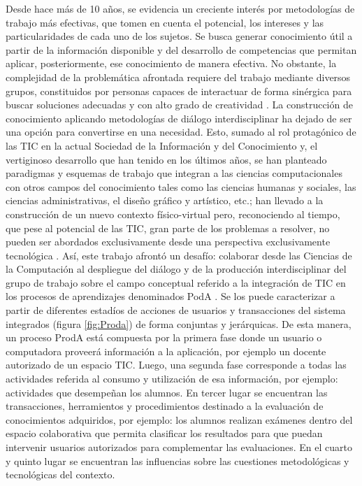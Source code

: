 Desde hace más de 10 años, se evidencia un creciente interés por metodologías de trabajo más efectivas, que tomen en cuenta el potencial, los intereses y las particularidades de cada uno de los sujetos. Se busca generar conocimiento útil a partir de la información disponible y del desarrollo de competencias que permitan aplicar, posteriormente, ese conocimiento de manera efectiva. No obstante, la complejidad de la problemática afrontada requiere del trabajo mediante diversos grupos, constituidos por personas capaces de interactuar de forma sinérgica para buscar soluciones adecuadas y con alto grado de creatividad \cite{cap1.1}. La construcción de conocimiento aplicando metodologías de diálogo interdisciplinar ha dejado de ser una opción para convertirse en una necesidad. Esto, sumado al rol protagónico de las TIC en la actual Sociedad de la Información y del Conocimiento y, el vertiginoso desarrollo que han tenido en los últimos años, se han planteado paradigmas y esquemas de trabajo que integran a las ciencias computacionales con otros campos del conocimiento tales como las ciencias humanas y sociales, las ciencias administrativas, el diseño gráfico y artístico, etc.; han llevado a la construcción de un nuevo contexto físico-virtual pero, reconociendo al tiempo, que pese al potencial de las TIC, gran parte de los problemas a resolver, no pueden ser abordados exclusivamente desde una perspectiva exclusivamente tecnológica \cite{cap1.2,cap1.3}. Así, este trabajo afrontó un desafío: colaborar desde las Ciencias de la Computación al despliegue del diálogo y de la producción interdisciplinar del grupo de trabajo sobre el campo conceptual referido a la integración de TIC en los procesos de aprendizajes denominados PodA \label{ProdA}. Se los puede caracterizar a partir de diferentes estadíos de acciones de usuarios y transacciones del sistema  integrados (figura \ref{fig:Proda}) de forma conjuntas y jerárquicas. De esta manera, un proceso ProdA está compuesta por la primera fase donde un usuario o computadora proveerá información a la aplicación, por ejemplo un docente autorizado de un espacio TIC. Luego, una segunda fase corresponde a todas las actividades referida al consumo y utilización de esa información,  por ejemplo: actividades que desempeñan los alumnos. En tercer lugar se encuentran las transacciones, herramientos y procedimientos destinado a la evaluación de conocimientos adquiridos,  por ejemplo: los alumnos realizan exámenes dentro del espacio colaborativa que permita clasificar los resultados para que puedan intervenir usuarios autorizados para complementar las evaluaciones.  En el cuarto y quinto lugar se encuentran las influencias sobre las cuestiones metodológicas y tecnológicas del contexto.



